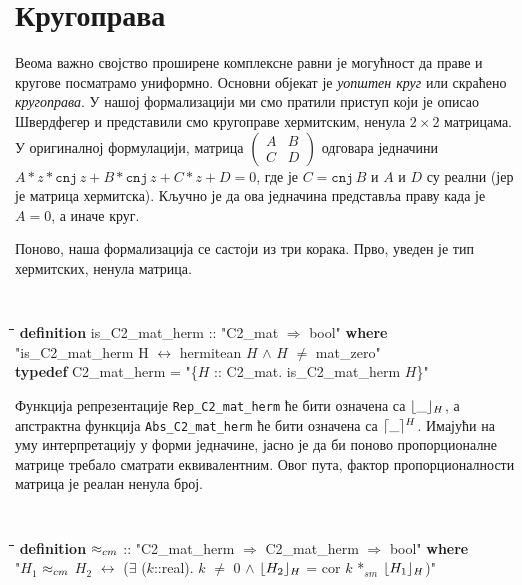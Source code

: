 \section{Кругоправа}
\label{subsec:circlines}
Веома важно својство проширене комплексне равни је могућност да праве
и кругове посматрамо униформно. Основни објекат је \emph{уопштен круг}
или скраћено \emph{кругоправа}. У нашој формализацији ми смо пратили
приступ који је описао Швердфегер \cite{schwerdtfeger} и представили
смо кругоправе хермитским, ненула $2\times 2$ матрицама. У оригиналној
формулацији, матрица $\left(\begin{array}{cc}A & B\\C &
  D\end{array}\right)$ одговара једначини $A*z*\mathtt{cnj}\,z +
  B*\mathtt{cnj}\,z + C*z + D = 0$, где је $C = \mathtt{cnj}\,B$ и $A$
  и $D$ су реални (јер је матрица хермитска).  Кључно је да ова
  једначина представља праву када је $A=0$, а иначе круг.

Поново, наша формализација се састоји из три корака. Прво, уведен је
тип хермитских, ненула матрица.

{\tt
\begin{tabbing}
\hspace{5mm}\=\hspace{5mm}\=\hspace{5mm}\=\hspace{5mm}\=\hspace{5mm}\=\kill
\textbf{definition} is\_C2\_mat\_herm :: "C2\_mat $\Rightarrow$ bool" \textbf{where}\\
\> "is\_C2\_mat\_herm H $\longleftrightarrow$ hermitean $H$ $\wedge$ $H$ $\neq$ mat\_zero"\\
\textbf{typedef} C2\_mat\_herm = "\{$H$ :: C2\_mat. is\_C2\_mat\_herm $H$\}"
\end{tabbing}
}

Функција репрезентације {\tt Rep\_C2\_mat\_herm} ће бити означена са
$\lfloor\_\rfloor_{H}$, а апстрактна функција {\tt Abs\_C2\_mat\_herm} ће бити
означена са $\lceil\_\rceil^{H}$.  Имајући на уму интерпретацију у форми
једначине, јасно је да би поново пропорционалне матрице требало
сматрати еквивалентним. Овог пута, фактор пропорционалности матрица је
реалан ненула број.

{\tt
\begin{tabbing}
\hspace{5mm}\=\hspace{5mm}\=\hspace{5mm}\=\hspace{5mm}\=\hspace{5mm}\=\kill
\textbf{definition} $\approx_{cm}$ :: "C2\_mat\_herm $\Rightarrow$ C2\_mat\_herm $\Rightarrow$ bool" \textbf{where}\\
\>"$H_1$ $\approx_{cm}$ $H_2$ $\longleftrightarrow$ ($\exists$ ($k$::real). $k$ $\neq$ $0$ $\wedge$ $\lfloor H_2\rfloor_{H}$ = cor $k$ *$_{sm}$ $\lfloor H_1\rfloor_{H}$)"
\end{tabbing}
}

